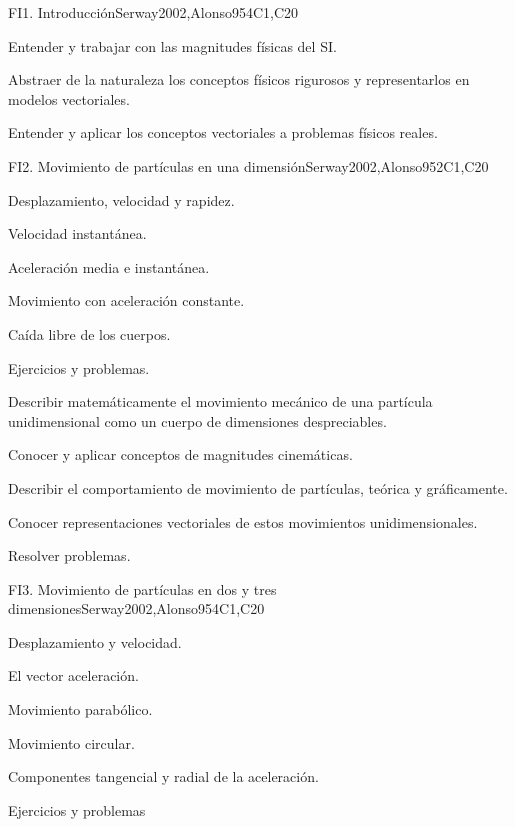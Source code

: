 \begin{syllabus}
\begin{unit}{FI1. Introducción}{}{Serway2002,Alonso95}{4}{C1,C20}
   \begin{learningoutcomes}
      \item Entender y trabajar con las magnitudes físicas del SI.
      \item Abstraer de la naturaleza los conceptos físicos rigurosos y representarlos en modelos vectoriales.
      \item Entender y aplicar los conceptos vectoriales a problemas físicos reales.
   \end{learningoutcomes}
\end{unit}

\begin{unit}{FI2. Movimiento de partículas en una dimensión}{}{Serway2002,Alonso95}{2}{C1,C20}
\begin{topics}
      \item Desplazamiento, velocidad y rapidez.
      \item Velocidad instantánea.
      \item Aceleración media e instantánea.
      \item Movimiento con aceleración constante.
      \item Caída libre de los cuerpos.
      \item Ejercicios y problemas.
    \end{topics}
   \begin{learningoutcomes}
      \item Describir matemáticamente el movimiento mecánico de una partícula unidimensional como un cuerpo de dimensiones despreciables.
      \item Conocer y aplicar conceptos de magnitudes cinemáticas.
      \item Describir el comportamiento de movimiento de partículas, teórica y gráficamente.
      \item Conocer representaciones vectoriales de estos movimientos unidimensionales.
      \item Resolver problemas.
   \end{learningoutcomes}
\end{unit}

\begin{unit}{FI3. Movimiento de partículas en dos y tres dimensiones}{}{Serway2002,Alonso95}{4}{C1,C20}
\begin{topics}
      \item Desplazamiento y velocidad.
      \item El vector aceleración.
      \item Movimiento parabólico.
      \item Movimiento circular.
      \item Componentes tangencial y radial de la aceleración.
      \item Ejercicios y problemas
\end{topics}


\end{unit}
\end{syllabus}
